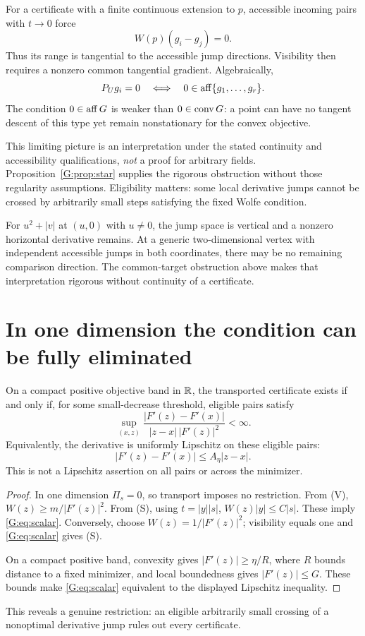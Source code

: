 For a certificate with a finite continuous extension to $p$, accessible incoming pairs with $t\to0$ force
\[
 W(p)(g_i-g_j)=0.
\]
Thus its range is tangential to the accessible jump directions. Visibility then requires a nonzero common tangential gradient. Algebraically,
\[
 P_Ug_i=0\quad\Longleftrightarrow\quad0\in\operatorname{aff}\{g_1,\dots,g_r\}.
\]
The condition $0\in\operatorname{aff} G$ is weaker than $0\in\operatorname{conv} G$: a point can have no tangent descent of this type yet remain nonstationary for the convex objective.

This limiting picture is an interpretation under the stated continuity and accessibility qualifications, \emph{not} a proof for arbitrary fields. Proposition~\ref{G:prop:star} supplies the rigorous obstruction without those regularity assumptions. Eligibility matters: some local derivative jumps cannot be crossed by arbitrarily small steps satisfying the fixed Wolfe condition.

For $u^2+|v|$ at $(u,0)$ with $u\ne0$, the jump space is vertical and a nonzero horizontal derivative remains. At a generic two-dimensional vertex with independent accessible jumps in both coordinates, there may be no remaining comparison direction. The common-target obstruction above makes that interpretation rigorous without continuity of a certificate.


\setcounter{section}{5}
\setcounter{theorem}{0}
\setcounter{equation}{5}
\section{In one dimension the condition can be fully eliminated}
\begin{proposition}
On a compact positive objective band in $\mathbb R$, the transported certificate exists if and only if, for some small-decrease threshold, eligible pairs satisfy
\begin{equation}
 \sup_{(x,z)}\frac{|F'(z)-F'(x)|}{|z-x|\,|F'(z)|^2}<\infty. \label{G:eq:scalar}
\end{equation}
Equivalently, the derivative is uniformly Lipschitz on these eligible pairs:
\[
 |F'(z)-F'(x)|\le A_\eta|z-x|.
\]
This is not a Lipschitz assertion on all pairs or across the minimizer.
\end{proposition}
\begin{proof}
In one dimension $\Pi_s=0$, so transport imposes no restriction. From (V),
$W(z)\ge m/|F'(z)|^2$. From (S), using $t=|y||s|$,
$W(z)|y|\le C|s|$. These imply \eqref{G:eq:scalar}. Conversely, choose
$W(z)=1/|F'(z)|^2$; visibility equals one and \eqref{G:eq:scalar} gives (S).

On a compact positive band, convexity gives $|F'(z)|\ge\eta/R$, where $R$ bounds distance to a fixed minimizer, and local boundedness gives $|F'(z)|\le G$. These bounds make \eqref{G:eq:scalar} equivalent to the displayed Lipschitz inequality.
\end{proof}
This reveals a genuine restriction: an eligible arbitrarily small crossing of a nonoptimal derivative jump rules out every certificate.

